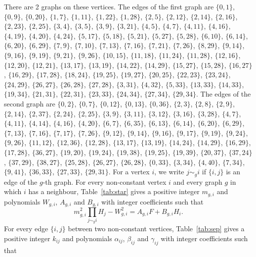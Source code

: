 \documentclass[11pt]{article}
\begin{document}
There are 2 graphs on these vertices. The edges of the first graph are $\{0,1\}$, $\{0,9\}$, $\{0,20\}$, $\{1,7\}$, $\{1,11\}$, $\{1,22\}$, $\{1,28\}$, $\{2,5\}$, $\{2,12\}$, $\{2,14\}$, $\{2,16\}$, $\{2,23\}$, $\{2,25\}$, $\{3,4\}$, $\{3,5\}$, $\{3,9\}$, $\{3,21\}$, $\{4,5\}$, $\{4,7\}$, $\{4,11\}$, $\{4,16\}$, $\{4,19\}$, $\{4,20\}$, $\{4,24\}$, $\{5,17\}$, $\{5,18\}$, $\{5,21\}$, $\{5,27\}$, $\{5,28\}$, $\{6,10\}$, $\{6,14\}$, $\{6,20\}$, $\{6,29\}$, $\{7,9\}$, $\{7,10\}$, $\{7,13\}$, $\{7,16\}$, $\{7,21\}$, $\{7,26\}$, $\{8,29\}$, $\{9,14\}$, $\{9,16\}$, $\{9,19\}$, $\{9,21\}$, $\{9,26\}$, $\{10,15\}$, $\{11,18\}$, $\{11,24\}$, $\{11,28\}$, $\{12,16\}$, $\{12,20\}$, $\{12,21\}$, $\{13,17\}$, $\{13,19\}$, $\{14,22\}$, $\{14,29\}$, $\{15,27\}$, $\{15,28\}$, $\{16,27\}$, $\{16,29\}$, $\{17,28\}$, $\{18,24\}$, $\{19,25\}$, $\{19,27\}$, $\{20,25\}$, $\{22,23\}$, $\{23,24\}$, $\{24,29\}$, $\{26,27\}$, $\{26,28\}$, $\{27,28\}$, $\{3,31\}$, $\{4,32\}$, $\{5,33\}$, $\{13,33\}$, $\{14,33\}$, $\{19,34\}$, $\{21,31\}$, $\{22,31\}$, $\{23,33\}$, $\{24,34\}$, $\{27,34\}$, $\{29,34\}$. The edges of the second graph are $\{0,2\}$, $\{0,7\}$, $\{0,12\}$, $\{0,13\}$, $\{0,36\}$, $\{2,3\}$, $\{2,8\}$, $\{2,9\}$, $\{2,14\}$, $\{2,37\}$, $\{2,24\}$, $\{2,25\}$, $\{3,9\}$, $\{3,11\}$, $\{3,12\}$, $\{3,16\}$, $\{3,28\}$, $\{4,7\}$, $\{4,11\}$, $\{4,14\}$, $\{4,16\}$, $\{4,20\}$, $\{6,7\}$, $\{6,35\}$, $\{6,13\}$, $\{6,14\}$, $\{6,20\}$, $\{6,29\}$, $\{7,13\}$, $\{7,16\}$, $\{7,17\}$, $\{7,26\}$, $\{9,12\}$, $\{9,14\}$, $\{9,16\}$, $\{9,17\}$, $\{9,19\}$, $\{9,24\}$, $\{9,26\}$, $\{11,12\}$, $\{12,36\}$, $\{12,28\}$, $\{13,17\}$, $\{13,19\}$, $\{14,24\}$, $\{14,29\}$, $\{16,29\}$, $\{17,28\}$, $\{36,27\}$, $\{19,20\}$, $\{19,24\}$, $\{19,38\}$, $\{19,25\}$, $\{19,39\}$, $\{20,37\}$, $\{37,24\}$, $\{37,29\}$, $\{38,27\}$, $\{25,28\}$, $\{26,27\}$, $\{26,28\}$, $\{0,33\}$, $\{3,34\}$, $\{4,40\}$, $\{7,34\}$, $\{9,41\}$, $\{36,33\}$, $\{27,33\}$, $\{29,31\}$. For a vertex $i$, we write $j\sim_g i$ if $\{i,j\}$ is an edge of the $g$-th graph.
For every non-constant vertex $i$ and every graph $g$ in which $i$ has a neighbour, Table~\ref{tab:star} gives a positive integer $m_{g,i}$ and polynomials $W_{g,i}$, $A_{g,i}$ and $B_{g,i}$ with integer coefficients such that
\begin{equation}\label{eq:star}
m_{g,i}^2\prod_{j\sim_g i}H_j-W_{g,i}^2=A_{g,i}F+B_{g,i}H_i.
\end{equation}
For every edge $\{i,j\}$ between two non-constant vertices, Table~\ref{tab:sep} gives a positive integer $k_{ij}$ and polynomials $\alpha_{ij}$, $\beta_{ij}$ and $\gamma_{ij}$ with integer coefficients such that
\end{document}
